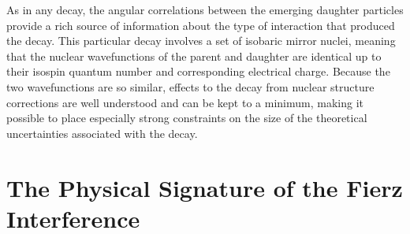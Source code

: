 As in any decay, the angular correlations between the emerging daughter particles provide a rich source of information about the type of interaction that produced the decay.  
This particular decay involves a set of isobaric mirror nuclei, meaning that the nuclear wavefunctions of the parent and daughter are identical up to their isospin quantum number and corresponding electrical charge.  Because the two wavefunctions are so similar, effects to the decay from nuclear structure corrections are well understood and can be kept to a minimum, making it possible to place especially strong constraints on the size of the theoretical uncertainties associated with the decay.










\section{The Physical Signature of the Fierz Interference}
